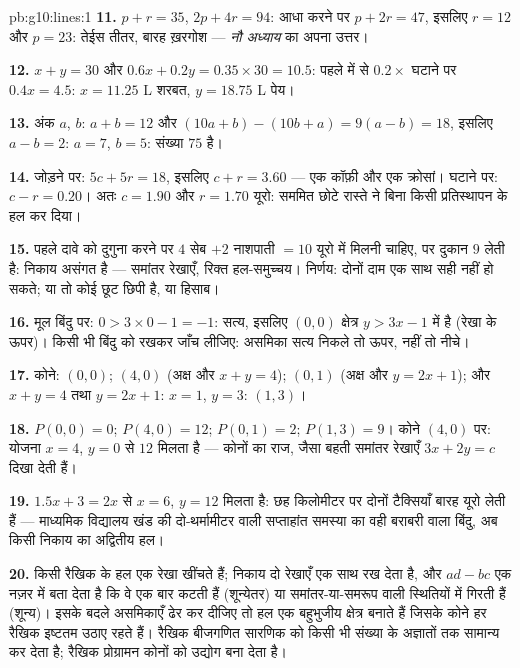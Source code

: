 \begin{solution}{pb:g10:lines:1}
\textbf{11.} $p + r = 35$, $2p + 4r = 94$: आधा करने पर $p + 2r = 47$, इसलिए $r = 12$ और $p = 23$: तेईस
तीतर, बारह ख़रगोश --- \emph{नौ अध्याय} का अपना उत्तर।

\textbf{12.} $x + y = 30$ और $0.6x + 0.2y = 0.35 \times 30 =
10.5$: पहले में से $0.2 \times$ घटाने पर $0.4x = 4.5$: $x = 11.25$ L शरबत,
$y = 18.75$ L पेय।

\textbf{13.} अंक $a$, $b$: $a + b = 12$ और $(10a + b) - (10b + a) = 9(a - b) = 18$, इसलिए $a - b = 2$: $a = 7$, $b = 5$:
संख्या $75$ है।

\textbf{14.} जोड़ने पर: $5c + 5r = 18$, इसलिए $c + r = 3.60$ --- एक कॉफ़ी और एक क्रोसां।
घटाने पर: $c - r = 0.20$। अतः $c = 1.90$ और $r = 1.70$ यूरो: सममित छोटे रास्ते ने बिना किसी
प्रतिस्थापन के हल कर दिया।

\textbf{15.} पहले दावे को दुगुना करने पर $4$ सेब $+ 2$ नाशपाती $= 10$ यूरो
में मिलनी चाहिए, पर दुकान $9$ लेती है: निकाय असंगत है --- समांतर रेखाएँ,
रिक्त हल-समुच्चय। निर्णय: दोनों दाम एक साथ सही नहीं हो सकते; या तो कोई छूट
छिपी है, या हिसाब।

\textbf{16.} मूल बिंदु पर: $0 > 3 \times 0 - 1 = -1$: सत्य, इसलिए $(0,0)$ क्षेत्र $y > 3x - 1$ में है
(रेखा के ऊपर)। किसी भी बिंदु को रखकर जाँच लीजिए: असमिका सत्य निकले तो ऊपर,
नहीं तो नीचे।

\textbf{17.} कोने: $(0, 0)$; $(4, 0)$ (अक्ष और $x + y = 4$); $(0, 1)$ (अक्ष और $y = 2x + 1$); और
$x + y = 4$ तथा $y = 2x + 1$: $x = 1$, $y = 3$: $(1, 3)$।

\textbf{18.} $P(0,0) = 0$; $P(4, 0) = 12$; $P(0, 1) = 2$; $P(1, 3) = 9$।  कोने $(4, 0)$ पर: योजना $x = 4$,
$y = 0$ से $12$ मिलता है --- कोनों का राज, जैसा बहती समांतर रेखाएँ $3x + 2y = c$
दिखा देती हैं।

\textbf{19.} $1.5x + 3 = 2x$ से $x = 6$, $y = 12$ मिलता है: छह किलोमीटर पर दोनों टैक्सियाँ
बारह यूरो लेती हैं --- माध्यमिक विद्यालय खंड की दो-थर्मामीटर वाली सप्ताहांत
समस्या का वही बराबरी वाला बिंदु, अब किसी निकाय का अद्वितीय हल।

\textbf{20.} किसी रैखिक  के हल एक रेखा खींचते हैं; निकाय दो रेखाएँ एक
साथ रख देता है, और $ad - bc$ एक नज़र में बता देता है कि वे एक बार कटती हैं
(शून्येतर) या समांतर-या-समरूप वाली स्थितियों में गिरती हैं (शून्य)। इसके
बदले असमिकाएँ ढेर कर दीजिए तो हल एक बहुभुजीय क्षेत्र बनाते हैं जिसके कोने
हर रैखिक इष्टतम उठाए रहते हैं। रैखिक बीजगणित सारणिक को किसी भी संख्या के
अज्ञातों तक सामान्य कर देता है; रैखिक प्रोग्रामन कोनों को उद्योग बना देता
है।
\end{solution}
